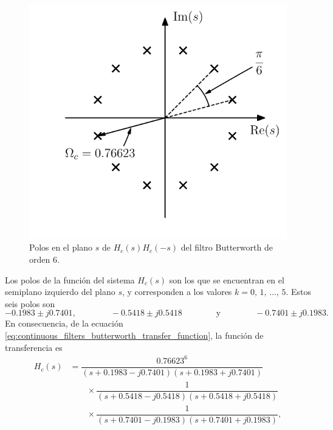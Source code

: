 \documentclass[a4paper]{report}
\begin{document}
\begin{figure}[!htb]
  \begin{minipage}[c]{0.45\textwidth}
    \includegraphics[width=\textwidth]{figuras/filter_design_example_07_03_poles.pdf}
  \end{minipage}\hfill
  \begin{minipage}[c]{0.45\textwidth}
    \caption{
      Polos en el plano \(s\) de \(H_c(s)H_c(-s)\) del filtro Butterworth de orden 6.
    }\label{fig:filter_design_example_07_03_poles}
  \end{minipage}
\end{figure}
Los polos de la función del sistema \(H_c(s)\) son los que se encuentran en el semiplano izquierdo del plano \(s\), y corresponden a los valores \(k=0,\,1,\,\dots,\,5\). Estos seis polos son
\begin{equation}\label{eq:filter_design_example_07_03_Hs_poles}
 -0.1983\pm j0.7401,
 \qquad\qquad
 -0.5418\pm j0.5418
 \qquad\qquad\textrm{y}\qquad\qquad
 -0.7401\pm j0.1983. 
\end{equation}
En consecuencia, de la ecuación \ref{eq:continuous_filters_butterworth_transfer_function}, la función de transferencia es
\begin{equation}
 \begin{aligned}\label{eq:filter_design_example_07_03_Hs}
  H_c(s)&=\dfrac{0.76623^6}
   {(s+0.1983-j0.7401)(s+0.1983+j0.7401)}\\
  &\qquad\times\dfrac{1}{(s+0.5418-j0.5418)(s+0.5418+j0.5418)}\\
  &\qquad\times\dfrac{1}{(s+0.7401-j0.1983)(s+0.7401+j0.1983)},  
 \end{aligned}
\end{equation}
\end{document}
